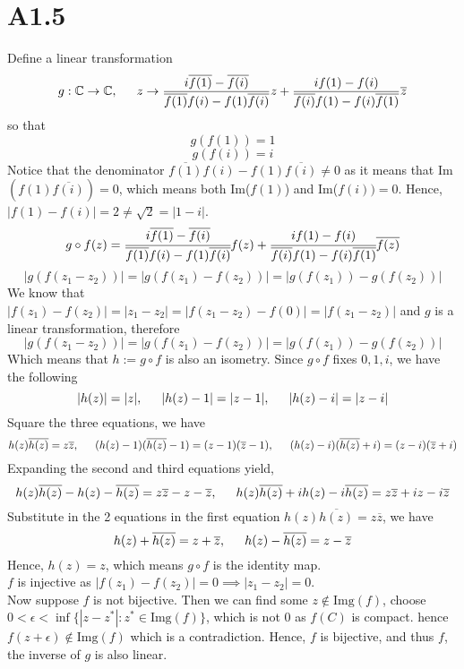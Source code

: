 \documentclass[11pt]{article}
\begin{document}
\section*{A1.5}
Define a linear transformation 
\[
    g: \mathbb{C} \to \mathbb{C}, \indent z \to \frac{i\overline{f(1)} - \overline{f(i)}}{\overline{f(1)}f(i) - f(1)\overline{f(i)}} z + \frac{if(1) - f(i)}{\overline{f(i)}f(1) - f(i)\overline{f(1)}} \overline{z}
\]
so that 
\[
    g(f(1)) = 1
\]
\[
    g(f(i)) = i    
\]
Notice that the denominator $\overline{f(1)}f(i) - f(1)\overline{f(i)} \ne 0$ as it means that Im$(f(1)\overline{f(i)}) = 0$, which means both Im($f(1)$) and Im($f(i)) = 0$. Hence, $|f(1)-f(i)| = 2 \ne \sqrt{2} = |1-i|$.\\
\begin{equation*}
    \begin{aligned}
        g \circ f(z) &= \cfrac{i\overline{f(1)} - \overline{f(i)}}{\overline{f(1)}f(i) - f(1)\overline{f(i)}}f(z) + \cfrac{if(1) - f(i)}{\overline{f(i)}f(1) - f(i)\overline{f(1)}} \overline{f(z)} \\
    \end{aligned}
\end{equation*}
\[
    |g(f(z_1 -z_2))|=  |g(f(z_1) -f(z_2))| = |g(f(z_1)) -g(f(z_2))|
\]
We know that $|f(z_1)-f(z_2)| = |z_1-z_2| = |f(z_1-z_2) - f(0)| = |f(z_1-z_2)|$ and $g$ is a linear transformation, therefore
\[
    |g(f(z_1-z_2))| = |g(f(z_1) - f(z_2))| = |g(f(z_1)) - g(f(z_2))|
\]
Which means that $h:=g\circ f$ is also an isometry. Since $g \circ f$ fixes $0,1,i$, we have the following
\[
    |h(z)| = |z|, \indent |h(z) - 1| = |z-1|, \indent |h(z)-i| = |z-i|
\]
Square the three equations, we have
\[
    h(z) \overline{h(z)} = z \overline{z}, \indent (h(z)-1)(\overline{h(z)}-1) =(z-1)(\overline{z}-1), \indent (h(z)-i)(\overline{h(z)}+i) =(z-i)(\overline{z}+i)
\]
Expanding the second and third equations yield, 
\[
    h(z)\overline{h(z)} - h(z) - \overline{h(z)} = z\overline{z} -z - \overline{z}, \indent h(z)\overline{h(z)} + ih(z) - i\overline{h(z)} = z\overline{z} +iz - i\overline{z} 
\]
Substitute in the 2 equations in the first equation $h(z)\overline{h(z)} = z \overline{z}$, we have
\[
    h(z)+\overline{h(z)} = z + \overline{z}, \indent h(z) - \overline{h(z)} = z - \overline{z}
\]
Hence, $h(z) = z$, which means $g\circ f$ is the identity map. \\
$f$ is injective as $|f(z_1) - f(z_2)| = 0 \implies |z_1 - z_2|=0$. \\
Now suppose $f$ is not bijective. Then we can find some $z \notin \text{Img}(f)$, choose $0< \epsilon < \inf \{|z-z^*| : z^* \in \text{Img}(f) \}$, which is not $0$ as $f(C)$ is compact. 
hence $f(z + \epsilon) \notin \text{Img}(f)$ which is a contradiction. Hence, $f$ is bijective, and thus $f$, the inverse of $g$ is also linear.
\end{document}
